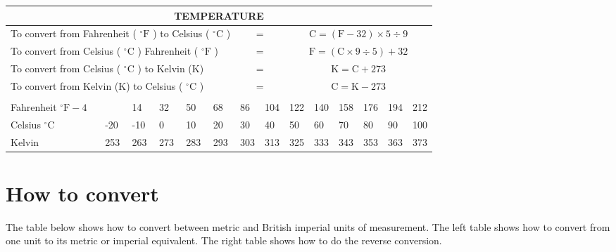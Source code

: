 \documentclass[10pt]{article}
\begin{document}
\begin{center}
\begin{tabular}{|l|l|l|l|l|l|l|l|l|l|l|l|l|l|}
\hline
\multicolumn{14}{|c|}{TEMPERATURE} \\
\hline
\multicolumn{6}{|l|}{To convert from Fahrenheit ( ${ }^{\circ} \mathrm{F}$ ) to Celsius ( ${ }^{\circ} \mathrm{C}$ )} & \multicolumn{2}{|c|}{=} & \multicolumn{6}{|c|}{$\mathrm{C}=(\mathrm{F}-32) \times 5 \div 9$} \\
\hline
\multicolumn{6}{|l|}{To convert from Celsius ( ${ }^{\circ} \mathrm{C}$ ) Fahrenheit ( ${ }^{\circ} \mathrm{F}$ )} & \multicolumn{2}{|c|}{=} & \multicolumn{6}{|c|}{$\mathrm{F}=(\mathrm{C} \times 9 \div 5)+32$} \\
\hline
\multicolumn{6}{|l|}{To convert from Celsius ( ${ }^{\circ} \mathrm{C}$ ) to Kelvin (K)} & \multicolumn{2}{|c|}{=} & \multicolumn{6}{|c|}{$\mathrm{K}=\mathrm{C}+273$} \\
\hline
\multicolumn{6}{|l|}{To convert from Kelvin (K) to Celsius ( ${ }^{\circ} \mathrm{C}$ )} & \multicolumn{2}{|c|}{=} & \multicolumn{6}{|c|}{$\mathrm{C}=\mathrm{K}-273$} \\
\hline
\multicolumn{14}{|c|}{} \\
\hline
Fahrenheit ${ }^{\circ} \mathrm{F}-4$ &  & 14 & 32 & 50 & 68 & 86 & 104 & 122 & 140 & 158 & 176 & 194 & 212 \\
\hline
Celsius ${ }^{\circ} \mathrm{C}$ & -20 & -10 & 0 & 10 & 20 & 30 & 40 & 50 & 60 & 70 & 80 & 90 & 100 \\
\hline
Kelvin & 253 & 263 & 273 & 283 & 293 & 303 & 313 & 325 & 333 & 343 & 353 & 363 & 373 \\
\hline
\end{tabular}
\end{center}

\section*{How to convert}
The table below shows how to convert between metric and British imperial units of measurement. The left table shows how to convert from one unit to its metric or imperial equivalent. The right table shows how to do the reverse conversion.
\end{document}
